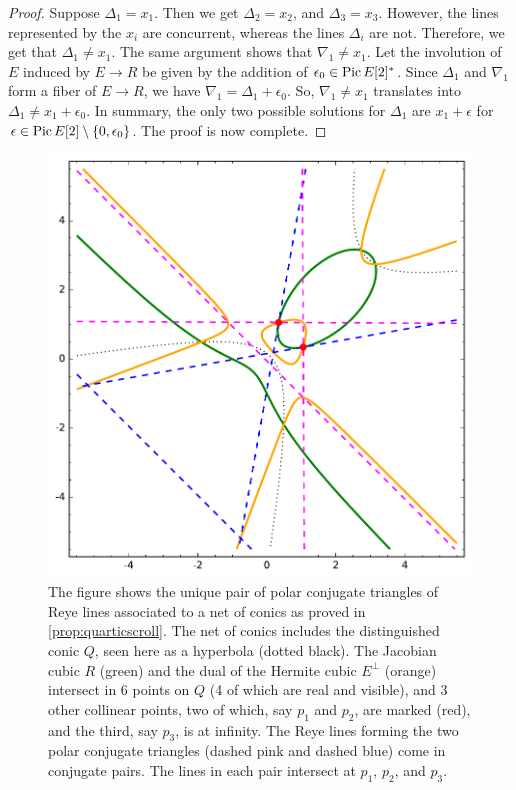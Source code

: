 \documentclass[11pt,reqno]{amsart}
\theoremstyle{plain}
\theoremstyle{definition}
\theoremstyle{remark}
\numberwithin{equation}{section}
\renewcommand{\to}{{\longrightarrow}}
\numberwithin{equation}{section}
\begin{document}
\begin{proof}
  Suppose $\Delta_1 = x_1$.
  Then we get $\Delta_2 = x_2$, and $\Delta_3 = x_3$.
  However, the lines represented by the $x_i$ are concurrent, whereas the lines $\Delta_i$ are not.
  Therefore, we get that $\Delta_1 \neq x_1$.
  The same argument shows that $\nabla_1 \neq x_1$.
  Let the involution of $E$ induced by $E \to R$ be given by the addition of $\epsilon_0 \in \operatorname{Pic} E [2]^*$.
  Since $\Delta_1$ and $\nabla_1$ form a fiber of $E \to R$, we have $\nabla_1 = \Delta_1 + \epsilon_0$.
  So, $\nabla_1 \neq x_1$ translates into $\Delta_1 \neq x_1 + \epsilon_0$.
  In summary, the only two possible solutions for $\Delta_1$ are $x_1 + \epsilon$ for $\epsilon \in \operatorname{Pic} E [2] \setminus \{0, \epsilon_0\}$.
  The proof is now complete.  
\end{proof}
\begin{figure}
  \centering
  \includegraphics{quartic_scroll}
  \caption{
    The figure shows the unique pair of polar conjugate triangles of Reye lines associated to a net of conics as proved in \autoref{prop:quarticscroll}.
    The net of conics includes the distinguished conic $Q$, seen here as a hyperbola (dotted black).
    The Jacobian cubic $R$ (green) and the dual of the Hermite cubic $E^\perp$ (orange) intersect in 6 points on $Q$ (4 of which are real and visible), and 3 other collinear points, two of which, say $p_1$ and $p_2$, are marked (red), and the third, say $p_3$, is at infinity.
    The Reye lines forming the two polar conjugate triangles (dashed pink and dashed blue) come in conjugate pairs.
    The lines in each pair intersect at $p_1$, $p_2$, and $p_3$.
  }
  \label{fig:quarticscroll}
\end{figure}


 
 
   
\end{document}

